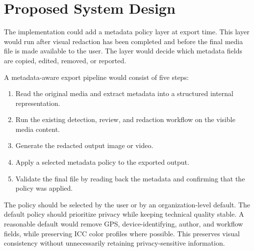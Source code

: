 \section{Proposed System Design}
The implementation could add a metadata policy layer at export time. This layer would run after visual redaction has been completed and before the final media file is made available to the user. The layer would decide which metadata fields are copied, edited, removed, or reported.

A metadata-aware export pipeline would consist of five steps:

\begin{enumerate}[leftmargin=1.5em]
    \item Read the original media and extract metadata into a structured internal representation.
    \item Run the existing detection, review, and redaction workflow on the visible media content.
    \item Generate the redacted output image or video.
    \item Apply a selected metadata policy to the exported output.
    \item Validate the final file by reading back the metadata and confirming that the policy was applied.
\end{enumerate}

The policy should be selected by the user or by an organization-level default. The default policy should prioritize privacy while keeping technical quality stable. A reasonable default would remove GPS, device-identifying, author, and workflow fields, while preserving ICC color profiles where possible. This preserves visual consistency without unnecessarily retaining privacy-sensitive information.

